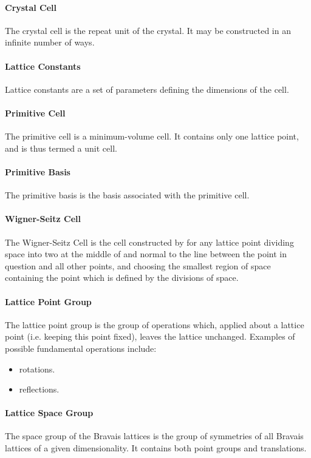 \paragraph{Crystal Cell}
The crystal cell is the repeat unit of the crystal. It may be constructed in an infinite number of ways.

\paragraph{Lattice Constants}
Lattice constants are a set of parameters defining the dimensions of the cell.

\paragraph{Primitive Cell}
The primitive cell is a minimum-volume cell. It contains only one lattice point, and is thus termed a unit cell.

\paragraph{Primitive Basis}
The primitive basis is the basis associated with the primitive cell.

\paragraph{Wigner-Seitz Cell}
The Wigner-Seitz Cell is the cell constructed by for any lattice point dividing space into two at the middle of and normal to the line between the point in question and all other points, and choosing the smallest region of space containing the point which is defined by the divisions of space.

\paragraph{Lattice Point Group}
The lattice point group is the group of operations which, applied about a lattice point (i.e. keeping this point fixed), leaves the lattice unchanged. Examples of possible fundamental operations include:
\begin{itemize}
	\item rotations.
	\item reflections.
\end{itemize}

\paragraph{Lattice Space Group}
The space group of the Bravais lattices is the group of symmetries of all Bravais lattices of a given dimensionality. It contains both point groups and translations.

